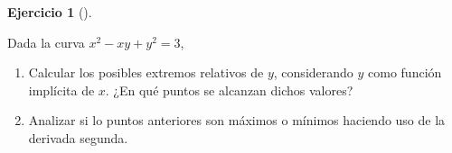 \documentclass[
  spanish,
  a4paper,
]{scrreport}
\providecommand{\tightlist}{%
  \setlength{\itemsep}{0pt}\setlength{\parskip}{0pt}}
\theoremstyle{definition}
\newtheorem{exercise}{Ejercicio}[chapter]
\theoremstyle{remark}
\begin{document}
\begin{exercise}[]\protect\hypertarget{exr-derivada-implicita-5}{}\label{exr-derivada-implicita-5}

Dada la curva \(x^2-xy+y^2=3\),

\begin{enumerate}
\def\labelenumi{\alph{enumi}.}
\tightlist
\item
  Calcular los posibles extremos relativos de \(y\), considerando \(y\)
  como función implícita de \(x\). ¿En qué puntos se alcanzan dichos
  valores?
\item
  Analizar si lo puntos anteriores son máximos o mínimos haciendo uso de
  la derivada segunda.
\end{enumerate}

\end{exercise}
\end{document}
